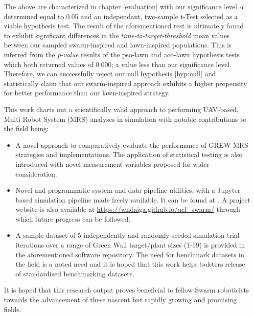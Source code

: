 \documentclass{report}
\begin{document}
The above are characterized in chapter \ref{evaluation} with our significance level $\alpha$ determined equal to 0.05 and an independant, two-sample t-Test selected as a viable hypothesis test. The result of the aforementioned test is ultimately found to exhibit significant differences in the \textit{time-to-target-threshold} mean values between our sampled swarm-inspired and lawn-inspired populations. This is inferred from the \textit{p-value} results of the pso-lawn and aco-lawn hypothesis tests which both returned values of $0.000$; a value less than our significance level. Therefore, we can successfully reject our null hypothesis \ref{hyp:null} and statistically claim that our swarm-inspired approach exhibits a higher propensity for better performance than our lawn-inspired strategy.

This work charts out a scientifically valid approach to performing UAV-based, Multi Robot System (MRS) analyses in simulation with notable contributions to the field being:

\begin{itemize}
	\item A novel approach to comparatively evaluate the performance of GREW-MRS strategies and implementations. The application of statistical testing is also introduced with novel measurement variables proposed for wider consideration.
	\item Novel and programmatic system and data pipeline utilities, with a Jupyter-based \cite{Jupyter} simulation pipeline made freely available. It can be found at \cite{SWARMCODE}. A project website is also available at \url{https://wndaiga.github.io/ucl_swarm/} through which future progress can be followed.
	\item A sample dataset of 5 independently and randomly seeded simulation trial iterations over a range of Green Wall target/plant sizes (1-19) is provided in the aforementioned software repository. The need for benchmark datasets in the field is a noted need and it is hoped that this work helps bolsters release of standardised benchmarking datasets.
\end{itemize}

It is hoped that this research output proves beneficial to fellow Swarm roboticists towards the advancement of these nascent but rapidly growing and promising fields.
\end{document}

